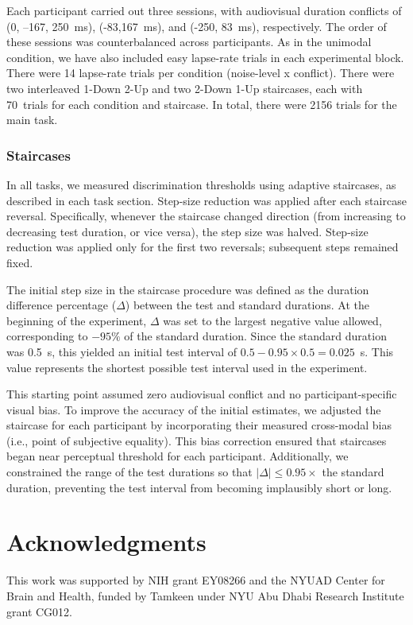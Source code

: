 \documentclass[9pt,lineno,doublespacing]{elife}
\begin{document}
Each participant carried out three sessions, with audiovisual duration conflicts of (0, --167, 250~ms), (-83,167~ms),  and (-250, 83~ms), respectively. The order of these sessions was counterbalanced across participants.  As in the unimodal condition, we have also included easy lapse-rate trials in each experimental block. There were 14 lapse-rate trials per condition (noise-level x conflict). There were two interleaved 1-Down 2-Up and two 2-Down 1-Up staircases, each with 70~trials for each condition and staircase. In total, there were 2156 trials for the main task.

\subsubsection{Staircases}

In all tasks, we measured discrimination thresholds using adaptive staircases, as described in each task section. Step-size reduction was applied after each staircase reversal. Specifically, whenever the staircase changed direction (from increasing to decreasing test duration, or vice versa), the step size was halved. Step-size reduction was applied only for the first two reversals; subsequent steps remained fixed.

The initial step size in the staircase procedure was defined as the duration difference percentage ($\Delta$) between the test and standard durations. At the beginning of the experiment, $\Delta$ was set to the largest negative value allowed, corresponding to $-95\%$ of the standard duration. Since the standard duration was 0.5~s, this yielded an initial test interval of $0.5 - 0.95 \times 0.5 = 0.025$~s. This value represents the shortest possible test interval used in the experiment.

This starting point assumed zero audiovisual conflict and no participant-specific visual bias. To improve the accuracy of the initial estimates, we adjusted the staircase for each participant by incorporating their measured cross-modal bias (i.e., point of subjective equality). This bias correction ensured that staircases began near perceptual threshold for each participant. Additionally, we constrained the range of the test durations so that $|\Delta| \leq 0.95 \times$ the standard duration, preventing the test interval from becoming implausibly short or long.



\section{Acknowledgments}
This work was supported by NIH grant EY08266 and the NYUAD Center for Brain and Health, funded by Tamkeen under NYU Abu Dhabi Research Institute grant CG012.
\end{document}
